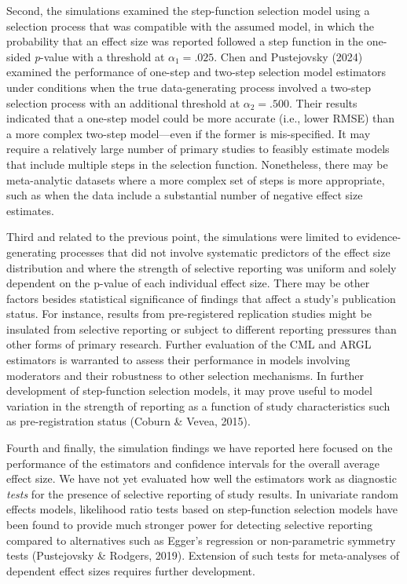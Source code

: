 \documentclass[
  man, donotrepeattitle,floatsintext]{apa7}
\begin{document}
Second, the simulations examined the step-function selection model using a selection process that was compatible with the assumed model, in which the probability that an effect size was reported followed a step function in the one-sided \emph{p}-value with a threshold at \(\alpha_1 = .025\).
Chen and Pustejovsky (2024) examined the performance of one-step and two-step selection model estimators under conditions when the true data-generating process involved a two-step selection process with an additional threshold at \(\alpha_2 = .500\).
Their results indicated that a one-step model could be more accurate (i.e., lower RMSE) than a more complex two-step model---even if the former is mis-specified.
It may require a relatively large number of primary studies to feasibly estimate models that include multiple steps in the selection function.
Nonetheless, there may be meta-analytic datasets where a more complex set of steps is more appropriate, such as when the data include a substantial number of negative effect size estimates.

Third and related to the previous point, the simulations were limited to evidence-generating processes that did not involve systematic predictors of the effect size distribution and where the strength of selective reporting was uniform and solely dependent on the p-value of each individual effect size.
There may be other factors besides statistical significance of findings that affect a study's publication status.
For instance, results from pre-registered replication studies might be insulated from selective reporting or subject to different reporting pressures than other forms of primary research.
Further evaluation of the CML and ARGL estimators is warranted to assess their performance in models involving moderators and their robustness to other selection mechanisms.
In further development of step-function selection models, it may prove useful to model variation in the strength of reporting as a function of study characteristics such as pre-registration status (Coburn \& Vevea, 2015).

Fourth and finally, the simulation findings we have reported here focused on the performance of the estimators and confidence intervals for the overall average effect size.
We have not yet evaluated how well the estimators work as diagnostic \emph{tests} for the presence of selective reporting of study results.
In univariate random effects models, likelihood ratio tests based on step-function selection models have been found to provide much stronger power for detecting selective reporting compared to alternatives such as Egger's regression or non-parametric symmetry tests (Pustejovsky \& Rodgers, 2019).
Extension of such tests for meta-analyses of dependent effect sizes requires further development.
\end{document}
